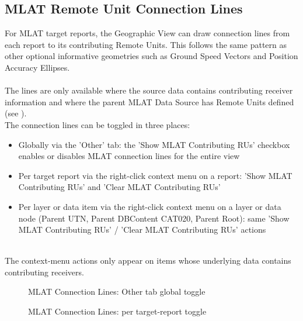 \subsection{MLAT Remote Unit Connection Lines}
\label{sec:geo_mlat_connection_lines}

For MLAT target reports, the Geographic View can draw connection lines from each report to its contributing Remote Units. This follows the same pattern as other optional informative geometries such as Ground Speed Vectors and Position Accuracy Ellipses. \\\\

The lines are only available where the source data contains contributing receiver information and where the parent MLAT Data Source has Remote Units defined (see ). \\

The connection lines can be toggled in three places: \\

\begin{itemize}
\item Globally via the 'Other' tab: the 'Show MLAT Contributing RUs' checkbox enables or disables MLAT connection lines for the entire view
\item Per target report via the right-click context menu on a report: 'Show MLAT Contributing RUs' and 'Clear MLAT Contributing RUs'
\item Per layer or data item via the right-click context menu on a layer or data node (Parent UTN, Parent DBContent CAT020, Parent Root): same 'Show MLAT Contributing RUs' / 'Clear MLAT Contributing RUs' actions
\end{itemize}
\ \\

The context-menu actions only appear on items whose underlying data contains contributing receivers. \\

\begin{figure}[H]
  \centering
  \caption{MLAT Connection Lines: Other tab global toggle}
\end{figure}

\begin{figure}[H]
  \centering
  \caption{MLAT Connection Lines: per target-report toggle}
\end{figure}

